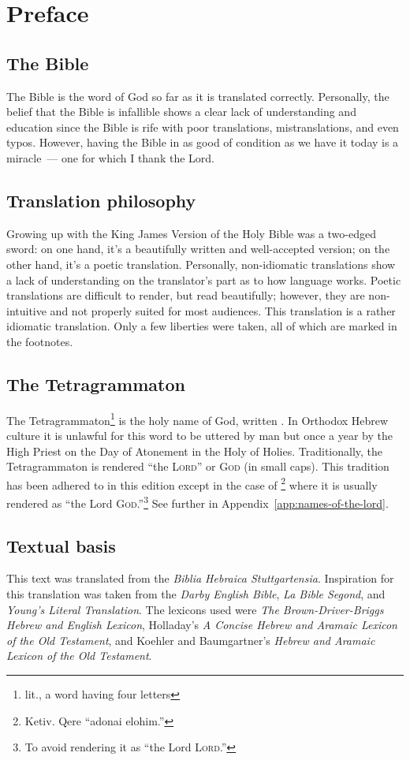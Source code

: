 \chapter{Preface}\thispagestyle{empty}
\section{The Bible}
The Bible is the word of God so far as it is translated correctly. Personally, the belief that the Bible is infallible shows a clear lack of understanding and education since the Bible is rife with poor translations, mistranslations, and even typos. However, having the Bible in as good of condition as we have it today is a miracle~--- one for which I thank the Lord.

\section{Translation philosophy}
Growing up with the King James Version of the Holy Bible was a two-edged sword: on one hand, it's a beautifully written and well-accepted version; on the other hand, it's a poetic translation. Personally, non-idiomatic translations show a lack of understanding on the translator's part as to how language works. Poetic translations are difficult to render, but read beautifully; however, they are non-intuitive and not properly suited for most audiences. This translation is a rather idiomatic translation. Only a few liberties were taken, all of which are marked in the footnotes.

\section{The Tetragrammaton}
The Tetragrammaton\footnote{lit., a word having four letters} is the holy name of God, written . In Orthodox Hebrew culture it is unlawful for this word to be uttered by man but once a year by the High Priest on the Day of Atonement in the Holy of Holies. Traditionally, the Tetragrammaton is rendered ``the \textsc{Lord}'' or \textsc{God} (in small caps). This tradition has been adhered to in this edition except in the case of \footnote{Ketiv. Qere ``adonai elohim.''} where it is usually rendered as ``the Lord \textsc{God}.''\footnote{To avoid rendering it as ``the Lord \textsc{Lord}.''} See further in Appendix~\ref{app:names-of-the-lord}.

\section{Textual basis}
This text was translated from the \emph{Biblia Hebraica Stuttgartensia}. Inspiration for this translation was taken from the \textit{Darby English Bible}, \textit{La Bible Segond}, and \textit{Young's Literal Translation}. The lexicons used were \emph{The Brown-Driver-Briggs Hebrew and English Lexicon}, Holladay's \emph{A Concise Hebrew and Aramaic Lexicon of the Old Testament}, and Koehler and Baumgartner's \emph{Hebrew and Aramaic Lexicon of the Old Testament}.


